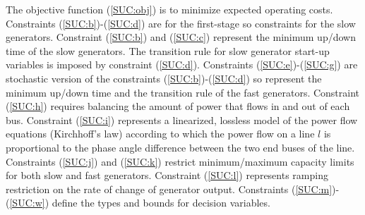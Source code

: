 The objective function (\ref{SUC:obj}) is to minimize expected operating costs. Constraints (\ref{SUC:b})-(\ref{SUC:d}) are for the first-stage so constraints for the slow generators. Constraint (\ref{SUC:b}) and (\ref{SUC:c}) represent the minimum up/down time of the slow generators. The transition rule for slow generator start-up variables is imposed by constraint (\ref{SUC:d}).  Constraints (\ref{SUC:e})-(\ref{SUC:g}) are stochastic version of the constraints (\ref{SUC:b})-(\ref{SUC:d}) so represent the minimum up/down time and the transition rule of the fast generators. Constraint (\ref{SUC:h}) requires balancing the amount of power that flows in and out of each bus. Constraint (\ref{SUC:i}) represents a linearized, lossless model of the power flow equations (Kirchhoff's law) according to which the power flow on a line $l$ is proportional to the phase angle difference between the two end buses of the line. Constraints (\ref{SUC:j}) and (\ref{SUC:k}) restrict minimum/maximum capacity limits for both slow and fast generators. Constraint (\ref{SUC:l}) represents ramping restriction on the rate of change of generator output. Constraints (\ref{SUC:m})-(\ref{SUC:w}) define the types and bounds for decision variables.
